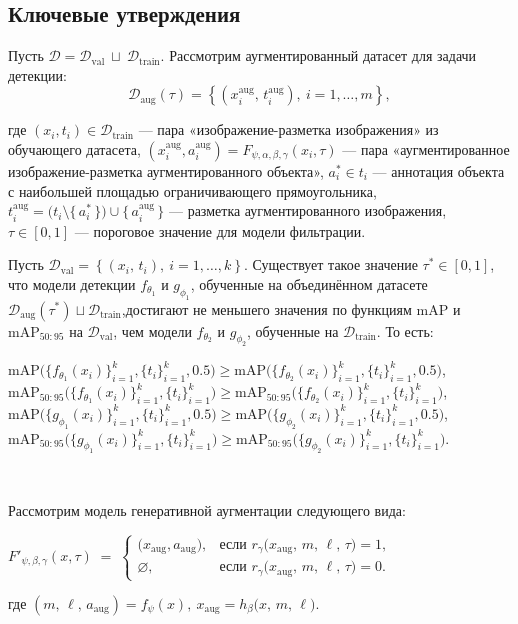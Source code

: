 \subsection{Ключевые утверждения}
Пусть $\mathcal{D} = \mathcal{D}_{\text{val}} \ \sqcup \ \mathcal{D}_{\text{train}}$. Рассмотрим аугментированный датасет для задачи детекции:
\[
\mathcal{D}_{\text{aug}}(\tau) =
\left\{
  (x_i^{\text{aug}},\,t_i^{\text{aug}}), \
  i = 1,\dots,m
\right\},
\]

где $(x_i, t_i) \in \mathcal{D}_{\mathrm{train}}$ — пара «изображение-разметка изображения» из обучающего датасета,
$(x_i^{\mathrm{aug}}, a_i^{\mathrm{aug}}) = F_{\psi,\alpha,\beta,\gamma}(x_i, \tau)$ — пара «аугментированное изображение-разметка аугментированного объекта»,
$a_i^* \in t_i$ — аннотация объекта с наибольшей площадью ограничивающего прямоугольника,
$t_i^{\mathrm{aug}} = \bigl(t_i \setminus \{\,a_i^*\,\}\bigr) \cup \{\,a_i^{\mathrm{aug}}\,\}$ — разметка аугментированного изображения,
$\tau \in [0,1]$ — пороговое значение для модели фильтрации.

\begin{statement1}
Пусть $\mathcal{D}_{\text{val}} =
\left\{
  (x_i,\,t_i), \
  i = 1,\dots,k
\right\}$. Существует такое значение $\tau^*\in[0,1]$, что модели детекции $f_{\theta_1}$ и $g_{\phi_1}$, обученные на объединённом датасете $\mathcal{D}_{\mathrm{aug}}(\tau^*)\sqcup\mathcal{D}_{\mathrm{train}}$,достигают не меньшего значения по функциям $\mathrm{mAP}$ и $\mathrm{mAP}_{50:95}$ на $\mathcal{D}_{\text{val}}$, чем модели $f_{\theta_2}$ и $g_{\phi_2}$, обученные на $\mathcal{D}_{\text{train}}$. То есть:
\begin{center}
$\mathrm{mAP}\bigl(\{f_{\theta_1}(x_i)\}_{i=1}^k,\{t_i\}_{i=1}^k,0.5\bigr)\ge\mathrm{mAP}\bigl(\{f_{\theta_2}(x_i)\}_{i=1}^k,\{t_i\}_{i=1}^k,0.5\bigr)$,  
$\mathrm{mAP}_{50:95}\bigl(\{f_{\theta_1}(x_i)\}_{i=1}^k,\{t_i\}_{i=1}^k\bigr)\ge\mathrm{mAP}_{50:95}\bigl(\{f_{\theta_2}(x_i)\}_{i=1}^k,\{t_i\}_{i=1}^k\bigr)$,  
$\mathrm{mAP}\bigl(\{g_{\phi_1}(x_i)\}_{i=1}^k,\{t_i\}_{i=1}^k,0.5\bigr)\ge\mathrm{mAP}\bigl(\{g_{\phi_2}(x_i)\}_{i=1}^k,\{t_i\}_{i=1}^k,0.5\bigr)$,  
$\mathrm{mAP}_{50:95}\bigl(\{g_{\phi_1}(x_i)\}_{i=1}^k,\{t_i\}_{i=1}^k\bigr)\ge\mathrm{mAP}_{50:95}\bigl(\{g_{\phi_2}(x_i)\}_{i=1}^k,\{t_i\}_{i=1}^k\bigr)$.
\end{center}
\
\end{statement1}



Рассмотрим модель генеративной аугментации следующего вида:
\begin{center}
$F'_{\psi,\beta,\gamma}(x, \tau) \;=\;
\begin{cases}
\bigl(x_{\text{aug}}, a_{\text{aug}}), 
& \text{если } r_{\gamma}\bigl(x_{\text{aug}},\,m,\,\ell,\,\tau\bigr) = 1,\\[1em]
\varnothing, 
& \text{если } r_{\gamma}\bigl(x_{\text{aug}},\,m,\,\ell,\,\tau\bigr) = 0.
\end{cases}
$
\end{center}
где 
$ 
(m,\,\ell,\, a_{\text{aug}}) = f_{\psi}(x),  \ x_{\text{aug}} = h_{\beta}\bigl(x,\,m,\, \ell \bigr)$.

